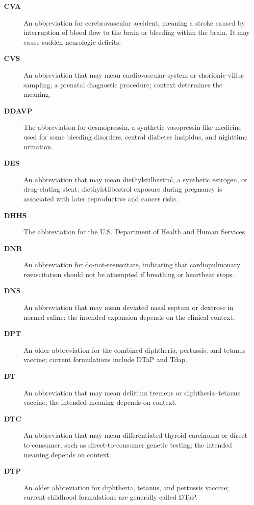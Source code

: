 \begin{description}
\item[\textbf{CVA}] An abbreviation for cerebrovascular accident, meaning a stroke caused by interruption of blood flow to the brain or
bleeding within the brain. It may cause sudden neurologic deficits.

\item[\textbf{CVS}] An abbreviation that may mean cardiovascular system or chorionic-villus sampling, a prenatal diagnostic procedure; context determines the meaning.

\item[\textbf{DDAVP}] The abbreviation for desmopressin, a synthetic vasopressin-like medicine used for some bleeding disorders, central diabetes insipidus, and nighttime urination.

\item[\textbf{DES}] An abbreviation that may mean diethylstilbestrol, a synthetic estrogen, or drug-eluting stent; diethylstilbestrol exposure during pregnancy is associated with later reproductive and cancer risks.

\item[\textbf{DHHS}] The abbreviation for the U.S. Department of Health and Human Services.

\item[\textbf{DNR}] An abbreviation for do-not-resuscitate, indicating that cardiopulmonary resuscitation should not be attempted if breathing or heartbeat stops.

\item[\textbf{DNS}] An abbreviation that may mean deviated nasal septum or dextrose in normal saline; the intended expansion depends on the clinical context.

\item[\textbf{DPT}] An older abbreviation for the combined diphtheria, pertussis, and tetanus vaccine; current formulations include DTaP and Tdap.

\item[\textbf{DT}] An abbreviation that may mean delirium tremens or diphtheria--tetanus vaccine; the intended meaning depends on context.

\item[\textbf{DTC}] An abbreviation that may mean differentiated thyroid carcinoma or direct-to-consumer, such as direct-to-consumer genetic testing; the intended meaning depends on context.

\item[\textbf{DTP}] An older abbreviation for diphtheria, tetanus, and pertussis vaccine; current childhood formulations are generally called DTaP.


\end{description}
